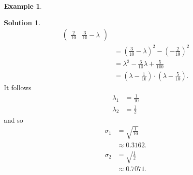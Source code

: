 \documentclass[a4paper,12 pt]{article}
\numberwithin{equation}{section}
\theoremstyle{definition}
\newtheorem{bsp}{Example}
\theoremstyle{remark}
\theoremstyle{definition}
\newtheorem*{lsg}{Solution}
\theoremstyle{definition}
\theoremstyle{definition}
\theoremstyle{remark}
\begin{document}
\begin{bsp}
\begin{lsg}
\begin{equation*}
\begin{split}
\begin{pmatrix}
\frac{2}{10}&\frac{3}{10}-\lambda
\end{pmatrix}\\
&=\left(\frac{3}{10}-\lambda \right)^2-\left(-\frac{2}{10}\right)^2\\
&=\lambda^2-\frac{6}{10}\lambda +\frac{5}{100}\\
&=\left(\lambda -\frac{1}{10} \right)\cdot \left(\lambda -\frac{5}{10} \right).
\end{split}
\end{equation*}
It follows
\begin{equation*}
\begin{split}
\lambda_1 &= \frac{1}{10}\\
\lambda_2 &= \frac{1}{2}
\end{split}
\end{equation*}
and so
\begin{equation*}
\begin{split}
\sigma_1 &=\sqrt{ \frac{1}{10}}\\
&\approx 0.3162.\\
\sigma_2 &= \sqrt{\frac{1}{2}}\\
&\approx 0.7071.
\end{split}
\end{equation*}


\end{lsg}
\end{bsp}

\newpage
\end{document}
